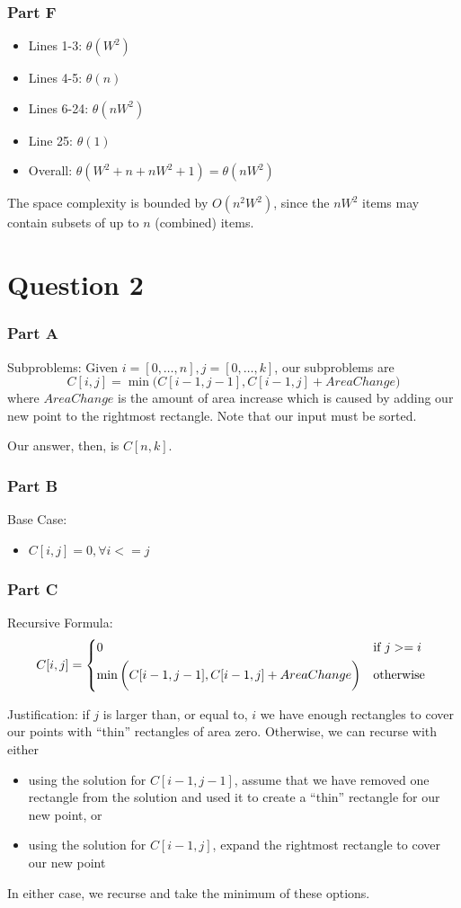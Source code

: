 \documentclass[12pt]{article}
\begin{document}
\subsubsection*{Part F}
\begin{itemize}
\item Lines 1-3: $\theta(W^2)$
\item Lines 4-5: $\theta(n)$
\item Lines 6-24: $\theta(nW^2)$
\item Line 25: $\theta(1)$
\item Overall: $\theta(W^2 + n + nW^2 + 1) = \theta(nW^2)$
\end{itemize}

The space complexity is bounded by $O(n^2W^2)$, since the $nW^2$ items may contain subsets of up to $n$ (combined) items.

\section*{Question 2}
\subsubsection*{Part A}
Subproblems: Given $i = [0, \dots, n], j = [0, \dots, k]$, our subproblems are \[ C[i, j] = \min{\bigg(C[i-1, j-1], C[i-1, j] + AreaChange\bigg)} \] where $AreaChange$ is the amount of area increase which is caused by adding our new point to the rightmost rectangle. Note that our input must be sorted.

Our answer, then, is $C[n, k]$.

\subsubsection*{Part B}
Base Case:
\begin{itemize}
\item $C[i, j] = 0, \forall i <= j$
\end{itemize}

\subsubsection*{Part C}
Recursive Formula: \[ C[i, j] = \begin{dcases*}
0 & if $j >= i$\\
\min{\bigg(C[i-1, j-1], C[i-1, j] + AreaChange\bigg)} & otherwise
\end{dcases*} \]

Justification: if $j$ is larger than, or equal to, $i$ we have enough rectangles to cover our points with ``thin'' rectangles of area zero. Otherwise, we can recurse with either
\begin{itemize}
\item using the solution for $C[i-1, j-1]$, assume that we have removed one rectangle from the solution and used it to create a ``thin'' rectangle for our new point, or
\item using the solution for $C[i-1, j]$, expand the rightmost rectangle to cover our new point
\end{itemize}
In either case, we recurse and take the minimum of these options.
\end{document}
